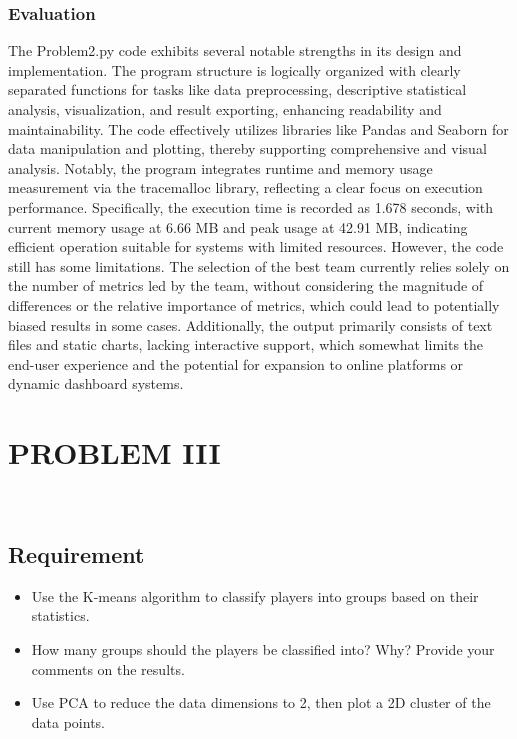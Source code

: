\documentclass[12pt]{report}
\begin{document}
{{\subsection{Evaluation} %
The Problem2.py code exhibits several notable strengths in its design and implementation. The program structure is logically organized with clearly separated functions for tasks like data preprocessing, descriptive statistical analysis, visualization, and result exporting, enhancing readability and maintainability. The code effectively utilizes libraries like Pandas and Seaborn for data manipulation and plotting, thereby supporting comprehensive and visual analysis. Notably, the program integrates runtime and memory usage measurement via the tracemalloc library, reflecting a clear focus on execution performance. Specifically, the execution time is recorded as 1.678 seconds, with current memory usage at 6.66 MB and peak usage at 42.91 MB, indicating efficient operation suitable for systems with limited resources.
However, the code still has some limitations. The selection of the best team currently relies solely on the number of metrics led by the team, without considering the magnitude of differences or the relative importance of metrics, which could lead to potentially biased results in some cases. Additionally, the output primarily consists of text files and static charts, lacking interactive support, which somewhat limits the end-user experience and the potential for expansion to online platforms or dynamic dashboard systems.
\chapter{PROBLEM III}\ %
{
\section{Requirement} %
\begin{itemize}
	\item Use the K-means algorithm to classify players into groups based on their statistics.
	\item How many groups should the players be classified into? Why? Provide your comments on the results.
	\item Use PCA to reduce the data dimensions to 2, then plot a 2D cluster of the data points.
\end{itemize}
}}}
\end{document}
